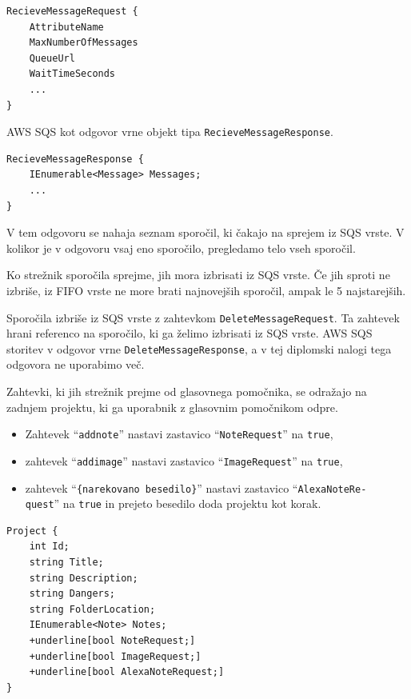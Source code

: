 \documentclass[a4paper, 12pt]{book}
\begin{document}
\begin{Verbatim}[commandchars=+\[\]]
RecieveMessageRequest {
    AttributeName 
    MaxNumberOfMessages 
    QueueUrl 
    WaitTimeSeconds
    ... 
} 
\end{Verbatim}

AWS SQS kot odgovor vrne objekt tipa \texttt{RecieveMessageResponse}.

\begin{Verbatim}[commandchars=+\[\]]
RecieveMessageResponse {
    IEnumerable<Message> Messages;
    ...
}
\end{Verbatim}

V tem odgovoru se nahaja seznam sporočil, ki čakajo na sprejem iz SQS vrste.
V kolikor je v odgovoru vsaj eno sporočilo, pregledamo telo vseh sporočil. 

Ko strežnik sporočila sprejme, jih mora izbrisati iz SQS vrste.
Če jih sproti ne izbriše, iz FIFO vrste ne more brati najnovejših sporočil, ampak le 5 najstarejših.

Sporočila izbriše iz SQS vrste z zahtevkom \texttt{DeleteMessageRequest}.
Ta zahtevek hrani referenco na sporočilo, ki ga želimo izbrisati iz SQS vrste.
AWS SQS storitev v odgovor vrne \texttt{DeleteMessageResponse}, a v tej diplomski nalogi tega odgovora ne uporabimo več.

Zahtevki, ki jih strežnik prejme od glasovnega pomočnika, se odražajo na zadnjem projektu, ki ga uporabnik z glasovnim pomočnikom odpre.
\begin{itemize}
	\item Zahtevek \enquote{\texttt{addnote}} nastavi zastavico \enquote{\texttt{NoteRequest}} na \texttt{true},
	\item zahtevek \enquote{\texttt{addimage}} nastavi zastavico \enquote{\texttt{ImageRequest}} na \texttt{true},
	\item zahtevek \enquote{\texttt{\{narekovano besedilo\}}} nastavi zastavico \enquote{\texttt{AlexaNoteRe-\\quest}} na \texttt{true} in prejeto besedilo doda projektu kot korak.
\end{itemize}

\begin{Verbatim}[commandchars=+\[\]]
Project { 
    int Id; 
    string Title; 
    string Description; 
    string Dangers; 
    string FolderLocation; 
    IEnumerable<Note> Notes; 
    +underline[bool NoteRequest;] 
    +underline[bool ImageRequest;] 
    +underline[bool AlexaNoteRequest;] 
}
\end{Verbatim}
\end{document}

